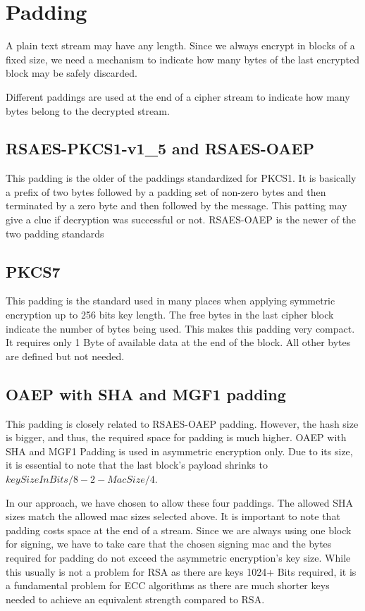\section{Padding}
A plain text stream may have any length. Since we always encrypt in blocks of a fixed size, we need a mechanism to indicate how many bytes of the last encrypted block may be safely discarded. 

Different paddings are used at the end of a cipher stream to indicate how many bytes belong to the decrypted stream.

\subsection{RSAES-PKCS1-v1\_5 and RSAES-OAEP}
This padding is the older of the paddings standardized for PKCS1. It is basically a prefix of two bytes followed by a padding set of non-zero bytes and then terminated by a zero byte and then followed by the message. This patting may give a clue if decryption was successful or not. RSAES-OAEP is the newer of the two padding standards 

\subsection{PKCS7} 
This padding is the standard used in many places when applying symmetric encryption up to 256 bits key length. The free bytes in the last cipher block indicate the number of bytes being used. This makes this padding very compact. It requires only 1 Byte of available data at the end of the block. All other bytes are defined but not needed.

\subsection{OAEP with SHA and MGF1 padding} 
This padding is closely related to RSAES-OAEP padding. However, the hash size is bigger, and thus, the required space for padding is much higher. OAEP with SHA and MGF1 Padding is used in asymmetric encryption only. Due to its size, it is essential to note that the last block's payload shrinks to $keySizeInBits/8-2-MacSize/4$.

In our approach, we have chosen to allow these four paddings. The allowed SHA sizes match the allowed mac sizes selected above. It is important to note that padding costs space at the end of a stream. Since we are always using one block for signing, we have to take care that the chosen signing mac and the bytes required for padding do not exceed the asymmetric encryption's key size. While this usually is not a problem for RSA as there are keys 1024+ Bits required, it is a fundamental problem for ECC algorithms as there are much shorter keys needed to achieve an equivalent strength compared to RSA. 

